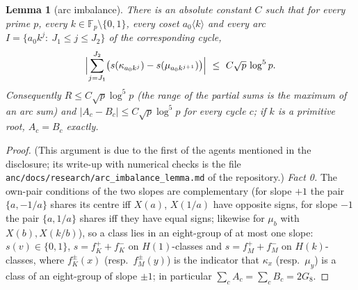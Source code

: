 \documentclass[11pt]{article}
\newtheorem{lemma}[theorem]{Lemma}
\theoremstyle{remark}
\newcommand{\Fp}{\mathbb{F}_p}
\begin{document}
\begin{lemma}[arc imbalance]\label{lem:arc}
There is an absolute constant $C$ such that for every prime $p$, every $k\in\Fp\setminus\{0,1\}$, every coset $a_0\langle k\rangle$ and every
arc $I=\{a_0k^j:\ J_1\le j\le J_2\}$ of the corresponding cycle,
\[
 \Bigl|\sum_{j=J_1}^{J_2}\bigl(s(\kappa_{a_0k^j})-s(\mu_{a_0k^{j+1}})\bigr)\Bigr|\ \le\ C\sqrt p\,\log^5p .
\]
Consequently $R\le C\sqrt p\log^5p$ (the range of the partial sums is the maximum of an arc sum) and $|A_c-B_c|\le C\sqrt p\log^5p$ for every
cycle $c$; if $k$ is a primitive root, $A_c=B_c$ exactly.
\end{lemma}
\begin{proof}
(This argument is due to the first of the agents mentioned in the disclosure; its write-up with numerical checks is the file
\texttt{anc/docs/research/}\allowbreak\texttt{arc\_imbalance\_lemma.md} of the repository.)
\emph{Fact 0.}  The own-pair conditions of the two slopes are complementary (for slope $+1$ the pair $\{a,-1/a\}$ shares its centre iff $X(a)$,
$X(1/a)$ have opposite signs, for slope $-1$ the pair $\{a,1/a\}$ shares iff they have equal signs; likewise for $\mu_b$ with $X(b),X(k/b)$), so
a class lies in an eight-group of at most one slope: $s(v)\in\{0,1\}$, $s=f^+_K+f^-_K$ on $H(1)$-classes and $s=f^+_M+f^-_M$ on $H(k)$-classes,
where $f^{\pm}_K(x)$ (resp.\ $f^\pm_M(y)$) is the indicator that $\kappa_x$ (resp.\ $\mu_y$) is a class of an eight-group of slope $\pm1$;
in particular $\sum_cA_c=\sum_cB_c=2G_8$.


\end{proof}
\end{document}

